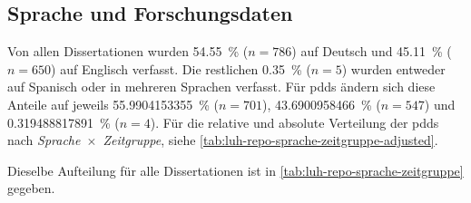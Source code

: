 \subsection{Sprache und Forschungsdaten}\label{sec:luh-repo-results-language}
Von allen Dissertationen wurden \SI[round-mode=places,round-precision=2]{54.55}{\percent} ($n=\num{786}$) auf Deutsch und \SI[round-mode=places,round-precision=2]{45,11}{\percent} ($n=\num{650}$) auf Englisch verfasst.
Die restlichen \SI[round-mode=places,round-precision=2]{0.35}{\percent} ($n=\num{5}$) wurden entweder auf Spanisch oder in mehreren Sprachen verfasst.
Für \glspl{pdd} ändern sich diese Anteile auf jeweils \SI[round-mode=places,round-precision=2]{55.9904153355}{\percent} ($n=\num{701}$), \SI[round-mode=places,round-precision=2]{43.6900958466}{\percent} ($n=\num{547}$) und \SI[round-mode=places,round-precision=2]{0.319488817891}{\percent} ($n=\num{4}$).
Für die relative und absolute Verteilung der \glspl{pdd} nach \textit{Sprache}~$\times$~\textit{Zeitgruppe}, siehe \cref{tab:luh-repo-sprache-zeitgruppe-adjusted}.
\begin{table}[!htbp]
	\caption{\gls{forschungsdaten}-Klassifizierung der \glspl{pdd} aus der Stichprobe nach \textit{Sprache}~$\times$~\textit{Zeitgruppe} aufgegliedert.
    Angaben relativ zu der Gesamtanzahl der jeweiligen Zeitgruppe.
    Absolute Werte in Klammern angegeben.}
    
    \label{tab:luh-repo-sprache-zeitgruppe-adjusted}
\end{table}
Dieselbe Aufteilung für alle Dissertationen ist in \cref{tab:luh-repo-sprache-zeitgruppe} gegeben.

